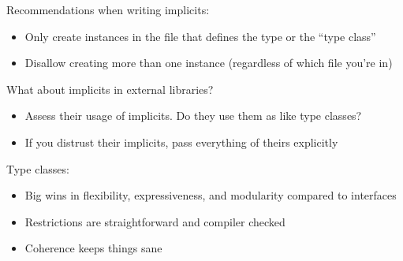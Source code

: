 \documentclass[usenames,dvipsnames,svgnames,table,aspectratio=169,mathserif]{beamer}
\newcommand{\nl}{\vspace{\baselineskip}}
\newcommand{\pnl}{\pause \nl}
\begin{document}
\begin{frame}
Recommendations when writing implicits:
\begin{itemize}
\item Only create instances in the file that defines the type or the ``type class''
\item Disallow creating more than one instance (regardless of which file you're in)
\end{itemize}

\pnl

What about implicits in external libraries?
\begin{itemize}
\item Assess their usage of implicits. Do they use them as like type classes?
\item If you distrust their implicits, pass everything of theirs explicitly
\end{itemize}
\end{frame}


\begin{frame}

Type classes:
\begin{itemize}
\item Big wins in flexibility, expressiveness, and modularity compared to interfaces
\item Restrictions are straightforward and compiler checked
\item Coherence keeps things sane
\end{itemize}
\end{frame}
\end{document}
